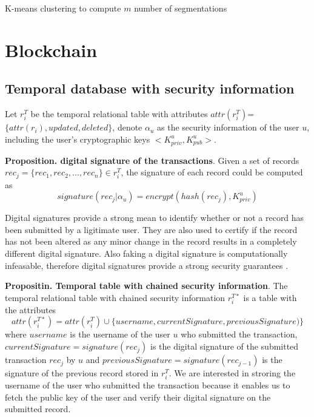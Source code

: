 \begin{algorithm}[H]
\SetAlgoLined
\caption{K-means clustering to compute $m$ number of segmentations}
\label{alg:Kmeans}
\DontPrintSemicolon
\end{algorithm}

\section{Blockchain}
\subsection{Temporal database with security information}
Let $r_i^T$ be the temporal relational table with attributes $attr(r_i^T)$=$\{attr(r_i), updated,deleted\}$, denote $\alpha_u$ as the security information of the user $u$, including the user's cryptographic keys $<K_{priv}^u, K_{pub}^u>$.


\textbf{Proposition. digital signature of the transactions}. Given a set of records $rec_j =\{rec_1,rec_2,...,rec_n\} \in r_i^T$, the signature of each record could be computed as $$signature(rec_j|\alpha_u)= encrypt(hash(rec_j),K_{priv}^u)$$  

Digital signatures provide a strong mean to identify whether or not a record has been submitted by a ligitimate user. They are also used to certify if the record has not been altered as any minor change in the record results in a completely different digital signature. Also faking a digital signature is computationally infeasable, therefore digital signatures provide a strong security guarantees \cite{katz2010digital}.

\textbf{Propositin. Temporal table with chained security information}.  The temporal relational table with chained security information $r_i^{T*}$ is a table with the attributes $$attr(r_i^{T*}) = attr(r_i^T) \cup \{username,currentSignature, previousSignature)\}$$ where $username$ is the username of the user $u$ who submitted the transaction, $currentSignature = signature(rec_j)$ is the digital signature of the submitted transaction $rec_j$ by $u$ and $previousSignature = signature(rec_{j-1})$ is the signature of the previous record stored in $r_i^T$. We are interested in stroring the username of the user who submitted the transaction because it enables us to fetch the public key of the user and verify their digital signature on the submitted record.

